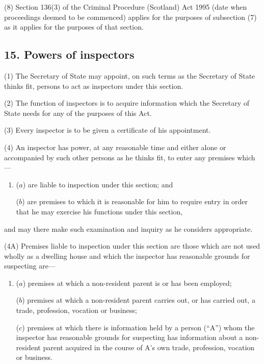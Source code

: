 \documentclass[12pt,a4paper]{article}
\begin{document}
(8)
Section 136(3) of the Criminal Procedure (Scotland) Act 1995 (date
when proceedings deemed to be commenced) applies for the purposes of subsection
(7) as it applies for the purposes of that section.


\subsection{15. Powers of inspectors}

(1) The Secretary of State may appoint, on such terms as the Secretary of State thinks fit, persons to act as inspectors under this section.

(2)
The function of inspectors is to acquire information which the Secretary of State needs for any of the purposes of this Act.

(3)
Every inspector is to be given a certificate of his appointment.

(4)
An inspector has power, at any reasonable time and either alone or accompanied by such other persons as he thinks fit, to enter any premises which---
\begin{enumerate}\item[]
($a$) are liable to inspection under this section; and

($b$) are premises to which it is reasonable for him to require entry in order that he may exercise his functions under this section,
\end{enumerate}
and may there make such examination and inquiry as he considers appropriate.

(4A) Premises liable to inspection under this section are those which are not used wholly as a dwelling house and which the inspector has reasonable grounds for suspecting are---
\begin{enumerate}\item[]
($a$) premises at which a non-resident parent is or has been employed;

($b$) premises at which a non-resident parent carries out, or has carried out, a trade, profession, vocation or business;

($c$) premises at which there is information held by a person (“A”) whom the inspector has reasonable grounds for suspecting has information about a non-resident parent acquired in the course of A’s own trade, profession, vocation or business.
\end{enumerate}
\end{document}
